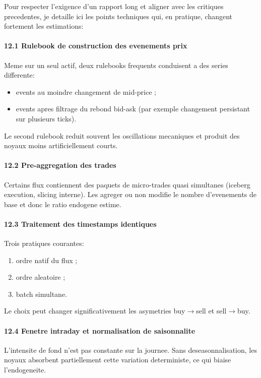 \documentclass[11pt,a4paper]{article}
\begin{document}
Pour respecter l'exigence d'un rapport long et aligner avec les critiques precedentes, je detaille ici les points techniques qui, en pratique, changent fortement les estimations:

\paragraph{12.1 Rulebook de construction des evenements prix}
Meme sur un seul actif, deux rulebooks frequents conduisent a des series differente:
\begin{itemize}[leftmargin=1.2cm]
    \item events au moindre changement de mid-price ;
    \item events apres filtrage du rebond bid-ask (par exemple changement persistant sur plusieurs ticks).
\end{itemize}
Le second rulebook reduit souvent les oscillations mecaniques et produit des noyaux moins artificiellement courts.

\paragraph{12.2 Pre-aggregation des trades}
Certains flux contiennent des paquets de micro-trades quasi simultanes (iceberg execution, slicing interne). Les agreger ou non modifie le nombre d'evenements de base et donc le ratio endogene estime.

\paragraph{12.3 Traitement des timestamps identiques}
Trois pratiques courantes:
\begin{enumerate}[leftmargin=1.2cm]
    \item ordre natif du flux ;
    \item ordre aleatoire ;
    \item batch simultane.
\end{enumerate}
Le choix peut changer significativement les asymetries buy$\rightarrow$sell et sell$\rightarrow$buy.

\paragraph{12.4 Fenetre intraday et normalisation de saisonnalite}
L'intensite de fond n'est pas constante sur la journee. Sans deseasonnalisation, les noyaux absorbent partiellement cette variation deterministe, ce qui biaise l'endogeneite.
\end{document}
